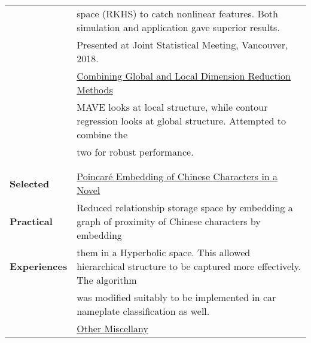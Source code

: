 \documentclass[utf8,letterpaper,oneside]{article}
\begin{document}
\begin{center}
\begin{tabular}{l l}
                           & space (RKHS) to catch nonlinear features. Both simulation and application gave superior results.                                                 \\
                           & Presented at Joint Statistical Meeting, Vancouver, 2018.                                                                                         \\
                           & \underline{Combining Global and Local Dimension Reduction Methods}                                                                               \\
                           & MAVE looks at local structure, while contour regression looks at global structure. Attempted to combine the                                      \\
                           & two for robust performance.                                                                                                                      \\
                           &                                                                                                                                                  \\ \hline
                           &                                                                                                                                                  \\
  \textbf{Selected}        & \underline{Poincar\'e Embedding of Chinese Characters in a Novel}                                                                                \\
  \textbf{Practical}       & Reduced relationship storage space by embedding a graph of proximity of Chinese characters by embedding                                          \\
  \textbf{Experiences}     & them in a Hyperbolic space. This allowed hierarchical structure to be captured more effectively. The algorithm                                   \\
                           & was modified suitably to be implemented in car nameplate classification as well.                                                                 \\
                           & \underline{Other Miscellany}                                                                                                                     \\

\end{tabular}
\end{center}
\end{document}
